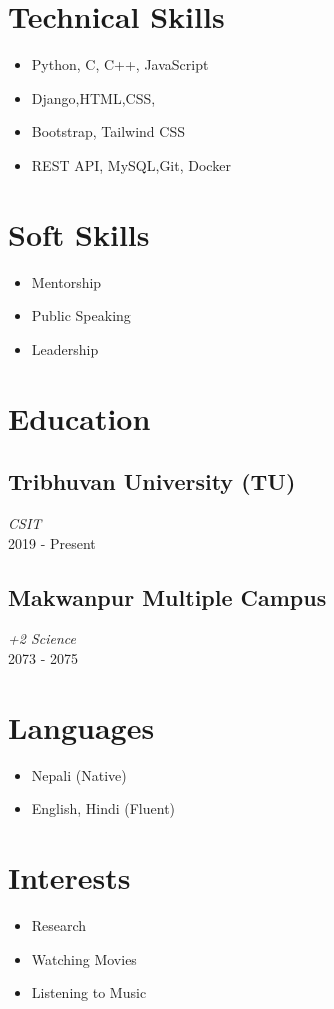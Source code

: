 \documentclass[a4paper,11pt]{article}
\begin{document}
\begin{minipage}[t]{0.4\textwidth}
  
    \section*{Technical Skills}
    \begin{itemize}
        \item Python, C, C++, JavaScript
        \item  Django,HTML,CSS,
        \item  Bootstrap, Tailwind CSS
        \item REST API, MySQL,Git, Docker
    \end{itemize}
    
    \section*{Soft Skills}
    \begin{itemize}
        \item Mentorship
        \item Public Speaking
        \item Leadership
    \end{itemize}
    
    \section*{Education}
    \subsection*{Tribhuvan University (TU)}
    \textit{CSIT} \\
    2019 - Present
    
    \subsection*{Makwanpur Multiple Campus}
    \textit{+2 Science} \\
    2073 - 2075
    
    \section*{Languages}
    \begin{itemize}
        \item Nepali (Native)
        \item English, Hindi (Fluent)
    \end{itemize}
    
    \section*{Interests}
    \begin{itemize}
        \item Research
        \item Watching Movies
        \item Listening to Music
    \end{itemize}
\end{minipage}
\end{document}
